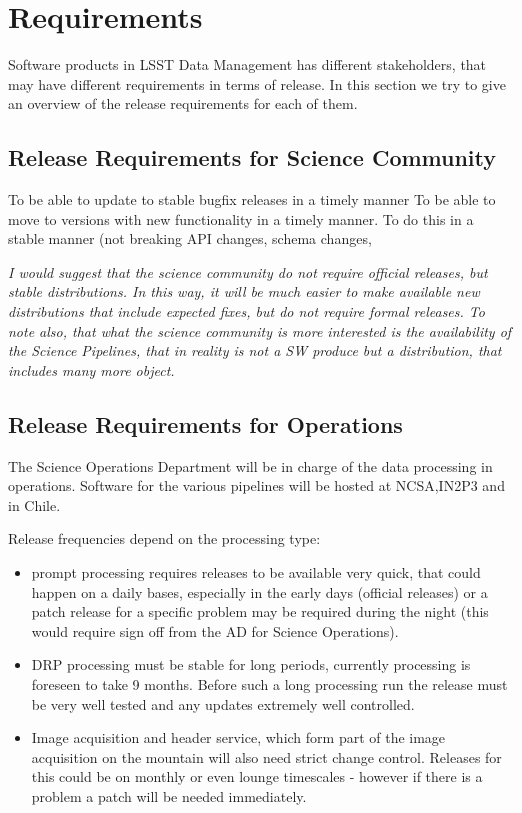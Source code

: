 \section{Requirements} \label{sec:reqs}

Software products in \gls{LSST} Data Management has different stakeholders, that may have different requirements in terms of release.
In this section we try to give an overview of the release requirements for each of them.


\subsection{Release Requirements for Science Community } \label{sec:comreqs}

To be able to update to stable bugfix releases in a timely manner
To be able to move to versions with new functionality in a timely manner.
To do this in a stable manner (not breaking \gls{API} changes, schema changes,

\textit{ I would suggest that the science community do not require official releases, but stable distributions.
In this way, it will be much easier to make available new distributions that include expected fixes,
but do not require formal releases.
To note also, that what the science community is more interested is the availability of the Science Pipelines,
that in reality is not a \gls{SW} produce but a distribution, that includes many more object.  }

\subsection{Release Requirements for Operations} \label{sec:procreqs}

The Science Operations Department will be  in charge  of the data processing in operations. Software for the various pipelines
will be hosted at \gls{NCSA},IN2P3 and in Chile.

Release frequencies depend on the processing type:

\begin{itemize}
\item prompt processing requires releases to be available very quick, that could happen on a daily bases, especially in the early days (official releases)
 or a  patch release  for a specific problem may be required during the night (this would require sign off from the \gls{AD} for Science Operations).
\item \gls{DRP} processing  must be stable for long periods, currently processing is foreseen to take 9 months.  Before such a long processing run the release must be very well tested and any updates extremely well controlled.
\item Image acquisition and header service, which form part of the image acquisition on the mountain will also need strict change control. Releases for this could be on monthly or even lounge timescales - however if there is a problem a patch will be needed immediately.
\end{itemize}

